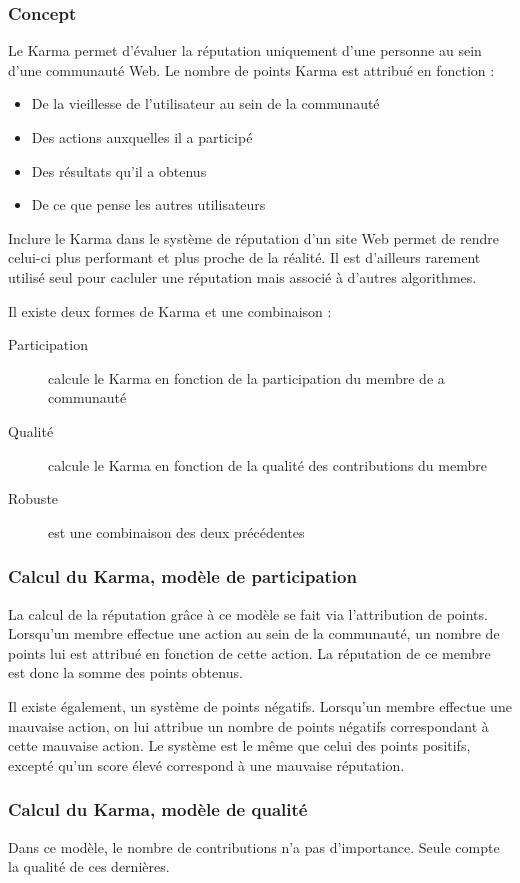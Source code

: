 \documentclass[a4paper, 11pt]{article} %
\begin{document}
\subsubsection{Concept}
Le Karma permet d'évaluer la réputation uniquement d'une personne au sein d'une communauté Web. Le nombre de points Karma est attribué en fonction :
\begin{itemize}
	\item De la vieillesse de l'utilisateur au sein de la communauté
	\item Des actions auxquelles il a participé
	\item Des résultats qu'il a obtenus
	\item De ce que pense les autres utilisateurs
\end{itemize}
Inclure le Karma dans le système de réputation d'un site Web permet de rendre celui-ci plus performant et plus proche de la réalité. Il est d'ailleurs rarement utilisé seul pour cacluler une réputation mais associé à d'autres algorithmes.

Il existe deux formes de Karma et une combinaison :
\begin{description}
	\item[Participation] calcule le Karma en fonction de la participation du membre de a communauté
	\item[Qualité] calcule le Karma en fonction de la qualité des contributions du membre
	\item[Robuste] est une combinaison des deux précédentes
\end{description}

\subsubsection{Calcul du Karma, modèle de participation}
La calcul de la réputation grâce à ce modèle se fait via l'attribution de points. Lorsqu'un membre effectue une action au sein de la communauté, un nombre de points lui est attribué en fonction de cette action. La réputation de ce membre est donc la somme des points obtenus.

Il existe également, un système de points négatifs. Lorsqu'un membre effectue une mauvaise action, on lui attribue un nombre de points négatifs correspondant à cette mauvaise action. Le système est le même que celui des points positifs, excepté qu'un score élevé correspond à une mauvaise réputation.

\subsubsection{Calcul du Karma, modèle de qualité}
Dans ce modèle, le nombre de contributions n'a pas d'importance. Seule compte la qualité de ces dernières. 
\end{document}
